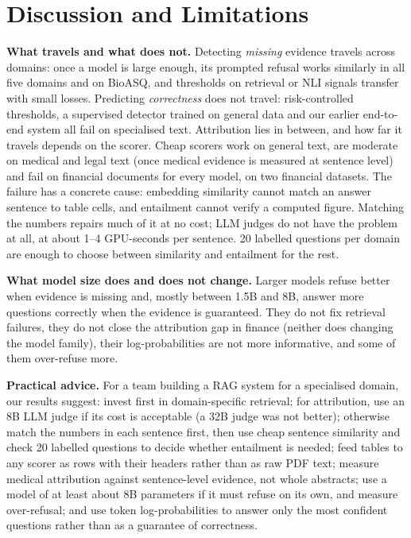 \documentclass[conference]{IEEEtran}
\begin{document}
\section{Discussion and Limitations}
\label{sec:limits}
\textbf{What travels and what does not.} Detecting \emph{missing} evidence travels across domains: once a model is large enough, its prompted refusal
works similarly in all five domains and on BioASQ, and thresholds on retrieval or NLI signals transfer with small losses. Predicting \emph{correctness}
does not travel: risk-controlled thresholds, a supervised detector trained on general data and our earlier end-to-end system all fail on specialised
text. Attribution lies in between, and how far it travels depends on the scorer. Cheap scorers work on general text, are moderate on medical and
legal text (once medical evidence is measured at sentence level) and fail on financial documents for every model, on two financial datasets. The
failure has a concrete cause: embedding similarity cannot match an answer sentence to table cells, and entailment cannot verify a computed figure.
Matching the numbers repairs much of it at no cost; LLM judges do not have the problem at all, at about 1--4 GPU-seconds per sentence. 20 labelled
questions per domain are enough to choose between similarity and entailment for the rest.

\textbf{What model size does and does not change.} Larger models refuse better when evidence is missing and, mostly between 1.5B and 8B, answer more questions correctly when
the evidence is guaranteed. They do not fix retrieval failures, they do not close the attribution gap in finance (neither does changing the model
family), their log-probabilities are not more informative, and some of them over-refuse more.

\textbf{Practical advice.} For a team building a RAG system for a specialised domain, our results suggest: invest first in domain-specific retrieval;
for attribution, use an 8B LLM judge if its cost is acceptable (a 32B judge was not better); otherwise match the numbers in each sentence first, then
use cheap sentence similarity and check 20 labelled questions to decide whether entailment is needed; feed tables to any scorer as rows with their
headers rather than as raw PDF text; measure medical attribution against sentence-level evidence, not whole abstracts; use a model of at least about 8B
parameters if it must refuse on its own, and measure over-refusal; and use token log-probabilities to answer only the most confident questions rather
than as a guarantee of correctness.
\end{document}
